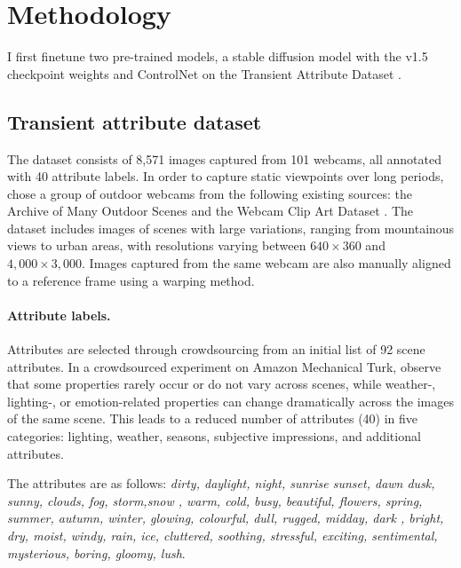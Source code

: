 \section{Methodology}
I first finetune two pre-trained models,  a stable diffusion model with the v1.5 checkpoint weights \cite{rombach2022high} and ControlNet \cite{zhang2023adding} on the Transient Attribute Dataset \cite{laffont2014transient}. 

\subsection{Transient attribute dataset} 

The dataset consists of 8,571 images captured from 101 webcams, all annotated with 40 attribute labels. In order to capture static viewpoints over long periods, \citeauthor{laffont2014transient} \cite{laffont2014transient} chose a group of outdoor webcams from the following existing sources: the Archive of Many Outdoor Scenes \cite{jacobs2007consistent} and the Webcam Clip Art Dataset \cite{lalonde2009webcam}. The dataset includes images of scenes with large variations, ranging from mountainous views to urban areas, with resolutions varying between $640 \times 360$ and $4,000 \times 3,000$. Images captured from the same webcam are also manually aligned to a reference frame using a warping method.

\paragraph{Attribute labels.} Attributes are selected through crowdsourcing from an initial list of 92 scene attributes. In a crowdsourced experiment on Amazon Mechanical Turk, \citeauthor{laffont2014transient} \cite{laffont2014transient} observe that some properties rarely occur or do not vary across scenes, while weather-, lighting-, or emotion-related properties can change dramatically across the images of the same scene. This leads to a reduced number of attributes (40) in five categories: lighting, weather, seasons, subjective impressions, and additional attributes.

The attributes are as follows: \textit{dirty, daylight, night, sunrise sunset, dawn dusk, sunny, clouds, fog, storm,snow
, warm, cold, busy, beautiful, flowers, spring, summer, autumn, winter, glowing, colourful, dull, rugged, midday, dark
, bright, dry, moist, windy, rain, ice, cluttered, soothing, stressful, exciting, sentimental, mysterious, boring, gloomy, lush}.

